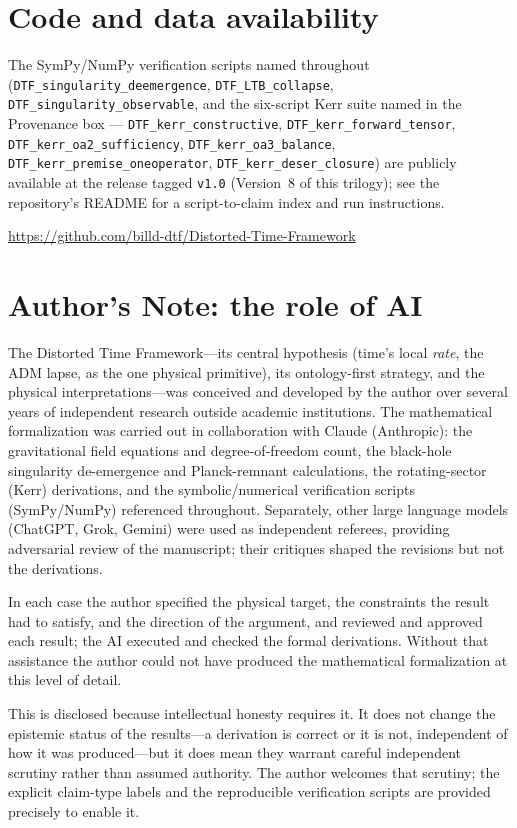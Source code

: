 \documentclass[11pt]{article}
\begin{document}
\section*{Code and data availability}
{\small The SymPy/NumPy verification scripts named throughout (\texttt{DTF\_singularity\_deemergence},
\texttt{DTF\_LTB\_collapse}, \texttt{DTF\_singularity\_observable}, and the six-script Kerr suite named in
the Provenance box --- \texttt{DTF\_kerr\_constructive}, \texttt{DTF\_kerr\_forward\_tensor},
\texttt{DTF\_kerr\_oa2\_sufficiency}, \texttt{DTF\_kerr\_oa3\_balance},
\texttt{DTF\_kerr\_premise\_oneoperator}, \texttt{DTF\_kerr\_deser\_closure}) are publicly available at the
release tagged \texttt{v1.0} (Version~8 of this trilogy); see the repository's README for a script-to-claim
index and run instructions.\par
\smallskip
\url{https://github.com/billd-dtf/Distorted-Time-Framework}\par}

\section*{Author's Note: the role of AI}
{\small
The Distorted Time Framework---its central hypothesis (time's local \emph{rate}, the ADM lapse,
as the one physical primitive), its ontology-first strategy, and the physical
interpretations---was conceived and developed by the author over several years of independent
research outside academic institutions. The mathematical formalization was carried out in
collaboration with Claude (Anthropic): the gravitational field equations and degree-of-freedom
count, the black-hole singularity de-emergence and Planck-remnant calculations, the rotating-sector
(Kerr) derivations, and the symbolic/numerical verification scripts (SymPy/NumPy) referenced
throughout. Separately, other large language models (ChatGPT, Grok, Gemini) were used as independent
referees, providing adversarial review of the manuscript; their critiques shaped the revisions but
not the derivations.

In each case the author specified the physical target, the constraints the result had to satisfy,
and the direction of the argument, and reviewed and approved each result; the AI executed and
checked the formal derivations. Without that assistance the author could not have produced the
mathematical formalization at this level of detail.

This is disclosed because intellectual honesty requires it. It does not change the epistemic status
of the results---a derivation is correct or it is not, independent of how it was produced---but it
does mean they warrant careful independent scrutiny rather than assumed authority. The author
welcomes that scrutiny; the explicit claim-type labels and the reproducible verification scripts are
provided precisely to enable it.
\par}
\end{document}

